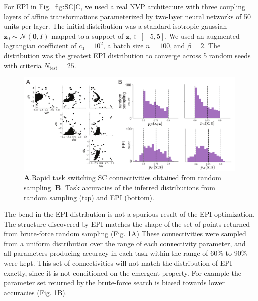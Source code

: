 \documentclass[11pt]{article}
\begin{document}
For EPI in Fig. \ref{fig:SC}C, we used a real NVP architecture with three coupling layers of affine transformations parameterized by two-layer neural networks of 50 units per layer.
The initial distribution was a standard isotropic gaussian $\mathbf{z}_0 \sim \mathcal{N}(\mathbf{0}, I)$ mapped to a support of $\mathbf{z}_i \in [-5, 5]$. 
We used an augmented lagrangian coefficient of $c_0 = 10^{2}$, a batch size $n=100$, and $\beta=2$.
The distribution was the greatest EPI distribution to converge across 5 random seeds with criteria $N_{\text{test}} = 25$.

\begin{figure}
\begin{center}
\includegraphics[scale=0.8]{figures/figSC8/figSC8.pdf}
\end{center}
\caption{
\textbf{A}.Rapid task switching SC connectivities obtained from random sampling.
\textbf{B}. Task accuracies of the inferred distributions from random sampling (top) and EPI (bottom).
}
\label{fig:SC8}
\end{figure}

The bend in the EPI distribution is not a spurious result of the EPI optimization.
The structure discovered by EPI matches the shape of the set of points returned from brute-force random sampling (Fig. \ref{fig:SC8}A) 
These connectivities were sampled from a uniform distribution over the range of each connectivity parameter, and all parameters producing accuracy in each task within the range of 60\% to 90\% were kept.
This set of connectivities will not match the distribution of EPI exactly, since it is not conditioned on the emergent property.
For example the parameter set returned by the brute-force search is biased towards lower accuracies (Fig. \ref{fig:SC8}B).
\end{document}

